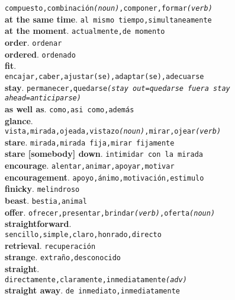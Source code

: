\documentclass[twocolumn]{article}
\begin{document}
        \texttt{compuesto,combinaci\'on{\scriptsize \textsl{(noun)}},componer,formar{\scriptsize \textsl{(verb)}}}\\
	\textsf{\textbf{at the same time}}. \texttt{al mismo tiempo,simultaneamente}\\
	\textsf{\textbf{at the moment}}. \texttt{actualmente,de momento}\\
	\textsf{\textbf{order}}. \texttt{ordenar}\\
	\textsf{\textbf{ordered}}. \texttt{ordenado}\\
	\textsf{\textbf{fit}}.\\ \texttt{encajar,caber,ajustar(se),adaptar(se),adecuarse}\\
	\textsf{\textbf{stay}}. \texttt{permanecer,quedarse{\scriptsize \textsl{(stay out=quedarse fuera stay ahead=anticiparse)}}}\\
	\textsf{\textbf{as well as}}. \texttt{como,asi como,adem\'as}\\
	\textsf{\textbf{glance}}.\\ \texttt{vista,mirada,ojeada,vistazo{\scriptsize \textsl{(noun)}},mirar,ojear{\scriptsize \textsl{(verb)}}}\\
	\textsf{\textbf{stare}}. \texttt{mirada,mirada fija,mirar fijamente}\\
  \textsf{\textbf{stare [somebody] down}}. \texttt{intimidar con la mirada}\\
	\textsf{\textbf{encourage}}. \texttt{alentar,animar,apoyar,motivar}\\
	\textsf{\textbf{encouragement}}. \texttt{apoyo,\'animo,motivaci\'on,estimulo}\\
	\textsf{\textbf{finicky}}. \texttt{melindroso}\\
	\textsf{\textbf{beast}}. \texttt{bestia,animal}\\
	\textsf{\textbf{offer}}. \texttt{ofrecer,presentar,brindar{\scriptsize \textsl{(verb)}},oferta{\scriptsize \textsl{(noun)}}}\\
	\textsf{\textbf{straightforward}}.\\ \texttt{sencillo,simple,claro,honrado,directo}\\
	\textsf{\textbf{retrieval}}. \texttt{recuperaci\'on}\\
	\textsf{\textbf{strange}}. \texttt{extra\~no,desconocido}\\
	\textsf{\textbf{straight}}.\\ \texttt{directamente,claramente,inmediatamente{\scriptsize \textsl{(adv)}}}\\
	\textsf{\textbf{straight away}}. \texttt{de inmediato,inmediatamente}\\
\end{document}
